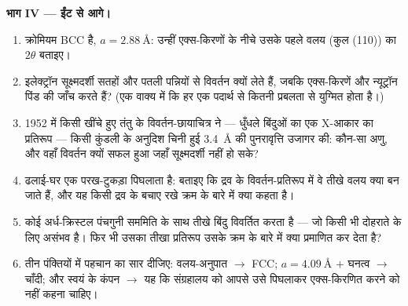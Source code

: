 \begin{problem}
\medskip\noindent\textbf{भाग IV --- ईंट से आगे।}

\begin{enumerate}[resume]
  \item क्रोमियम BCC है, $a = \qty{2.88}{\angstrom}$: उन्हीं
        एक्स-किरणों के नीचे उसके पहले वलय (कुल (110)) का
        $2\theta$ बताइए।
  \item इलेक्ट्रॉन सूक्ष्मदर्शी सतहों और पतली पन्नियों से विवर्तन
        क्यों लेते हैं, जबकि एक्स-किरणें और न्यूट्रॉन पिंड की जाँच
        करते हैं? (एक वाक्य में कि हर एक पदार्थ से कितनी प्रबलता से
        युग्मित होता है।)
  \item 1952 में किसी खींचे हुए तंतु के विवर्तन-छायाचित्र ने ---
        धुँधले बिंदुओं का एक X-आकार का प्रतिरूप --- किसी कुंडली के
        अनुदिश चिनी हुई \qty{3.4}{\angstrom} की पुनरावृत्ति उजागर
        की: कौन-सा अणु, और वहाँ विवर्तन क्यों सफल हुआ जहाँ
        सूक्ष्मदर्शी नहीं हो सके?
  \item ढलाई-घर एक परख-टुकड़ा पिघलाता है: बताइए कि द्रव के
        विवर्तन-प्रतिरूप में वे तीखे वलय क्या बन जाते हैं, और यह
        किसी द्रव के बचाए रखे क्रम के बारे में क्या कहता है।
  \item कोई अर्ध-क्रिस्टल पंचगुनी सममिति के साथ तीखे बिंदु विवर्तित
        करता है --- जो किसी भी दोहराते  के लिए असंभव है। फिर भी
        उसका तीखा प्रतिरूप उसके क्रम के बारे में क्या प्रमाणित कर
        देता है?
  \item तीन पंक्तियों में पहचान का सार दीजिए: वलय-अनुपात
        $\to$ FCC; $a = \qty{4.09}{\angstrom}$ $+$ घनत्व $\to$
        चाँदी; और स्वयं  के कंपन $\to$ यह कि
        संग्रहालय को आपसे उसे पिघलाकर एक्स-किरणित करने को नहीं कहना
        चाहिए।
\end{enumerate}
\end{problem}
